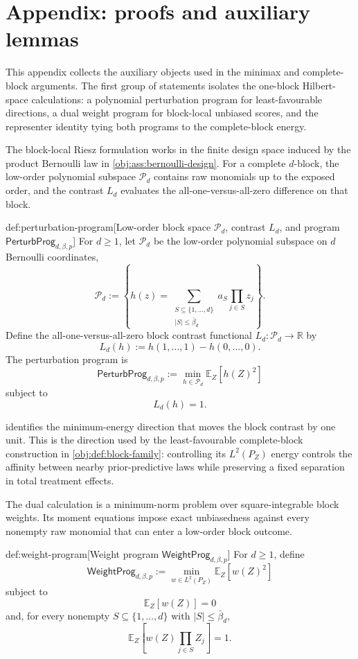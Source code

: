 \section{Appendix: proofs and auxiliary lemmas}

This appendix collects the auxiliary objects used in the minimax and complete-block arguments. The first group of statements isolates the one-block Hilbert-space calculations: a polynomial perturbation program for least-favourable directions, a dual weight program for block-local unbiased scores, and the representer identity tying both programs to the complete-block energy.

The block-local Riesz formulation works in the finite design space induced by the product Bernoulli law in \cref{obj:ass:bernoulli-design}. For a complete \(d\)-block, the low-order polynomial subspace \(\mathcal P_d\) contains raw monomials up to the exposed order, and the contrast \(L_d\) evaluates the all-one-versus-all-zero difference on that block.

\begin{definitionv}{def:perturbation-program}[Low-order block space $\mathcal P_d$, contrast $L_d$, and program $\mathsf{PerturbProg}_{d,\beta,p}$]
For \(d\ge 1\), let \(\mathcal P_d\) be the low-order polynomial subspace on \(d\) Bernoulli coordinates,
\[
\mathcal P_d
:=
\left\{
h(z)=\sum_{\substack{S\subseteq \{1,\ldots,d\}\\ |S|\le \bar\beta_d}}
a_S\prod_{j\in S}z_j
\right\}.
\]
Define the all-one-versus-all-zero block contrast functional \(L_d:\mathcal P_d\to\mathbb R\) by
\[
L_d(h)
:=
h(1,\ldots,1)-h(0,\ldots,0).
\]
The perturbation program is
\[
\mathsf{PerturbProg}_{d,\beta,p}
:=
\min_{h\in\mathcal P_d}\mathbb E_Z[h(Z)^2]
\]
subject to
\[
L_d(h)=1.
\]
\end{definitionv}

 identifies the minimum-energy direction that moves the block contrast by one unit. This is the direction used by the least-favourable complete-block construction in \cref{obj:def:block-family}: controlling its \(L^2(P_Z)\) energy controls the affinity between nearby prior-predictive laws while preserving a fixed separation in total treatment effects.

The dual calculation is a minimum-norm problem over square-integrable block weights. Its moment equations impose exact unbiasedness against every nonempty raw monomial that can enter a low-order block outcome.

\begin{definitionv}{def:weight-program}[Weight program \(\mathsf{WeightProg}_{d,\beta,p}\)]
For \(d\ge 1\), define
\[
\mathsf{WeightProg}_{d,\beta,p}
:=
\min_{w\in L^2(P_Z)}\mathbb E_Z[w(Z)^2]
\]
subject to
\[
\mathbb E_Z[w(Z)]=0
\]
and, for every nonempty \(S\subseteq\{1,\ldots,d\}\) with \(|S|\le\bar\beta_d\),
\[
\mathbb E_Z\left[w(Z)\prod_{j\in S}Z_j\right]=1.
\]
\end{definitionv}

